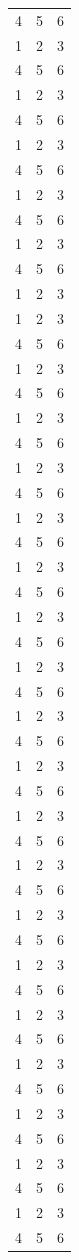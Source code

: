 \documentclass[dsc,pdfa]{coppe}
\begin{document}
\begin{longtable}{|c|c|c|}
4 & 5 & 6 \\
1 & 2 & 3 \\
4 & 5 & 6 \\
1 & 2 & 3 \\
4 & 5 & 6 \\
1 & 2 & 3 \\
4 & 5 & 6 \\1 & 2 & 3 \\
4 & 5 & 6 \\
1 & 2 & 3 \\
4 & 5 & 6 \\
1 & 2 & 3 \\
1 & 2 & 3 \\
4 & 5 & 6 \\
1 & 2 & 3 \\
4 & 5 & 6 \\
1 & 2 & 3 \\
4 & 5 & 6 \\
1 & 2 & 3 \\
4 & 5 & 6 \\
1 & 2 & 3 \\
4 & 5 & 6 \\
1 & 2 & 3 \\
4 & 5 & 6 \\
1 & 2 & 3 \\
4 & 5 & 6 \\
1 & 2 & 3 \\
4 & 5 & 6 \\
1 & 2 & 3 \\
4 & 5 & 6 \\
1 & 2 & 3 \\
4 & 5 & 6 \\
1 & 2 & 3 \\
4 & 5 & 6 \\
1 & 2 & 3 \\
4 & 5 & 6 \\
1 & 2 & 3 \\
4 & 5 & 6 \\
1 & 2 & 3 \\
4 & 5 & 6 \\
1 & 2 & 3 \\
4 & 5 & 6 \\
1 & 2 & 3 \\
4 & 5 & 6 \\
1 & 2 & 3 \\
4 & 5 & 6 \\
1 & 2 & 3 \\
4 & 5 & 6 \\
1 & 2 & 3 \\
4 & 5 & 6 \\

\end{longtable}
\end{document}
